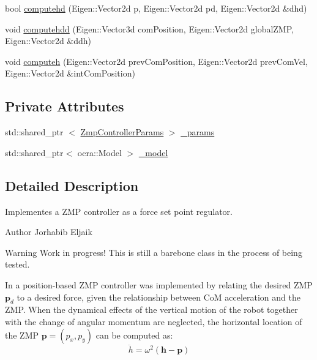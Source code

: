 \begin{DoxyCompactItemize}
\item 
bool \hyperlink{classZmpController_a5eab881a51fb2ace1a1d494171353bc7}{computehd} (\-Eigen\-::\-Vector2d p, \-Eigen\-::\-Vector2d pd, \-Eigen\-::\-Vector2d \&dhd)
\item 
void \hyperlink{classZmpController_aa450c67048a44fe0dfadf07cd30165e7}{computehdd} (\-Eigen\-::\-Vector3d com\-Position, \-Eigen\-::\-Vector2d global\-Z\-M\-P, \-Eigen\-::\-Vector2d \&ddh)
\item 
void \hyperlink{classZmpController_a3e275de73186b889c755e6dc618d29bf}{computeh} (\-Eigen\-::\-Vector2d prev\-Com\-Position, \-Eigen\-::\-Vector2d prev\-Com\-Vel, \-Eigen\-::\-Vector2d \&int\-Com\-Position)
\end{DoxyCompactItemize}
\subsection*{\-Private \-Attributes}
\begin{DoxyCompactItemize}
\item 
std\-::shared\-\_\-ptr\*
$<$ \hyperlink{structZmpControllerParams}{\-Zmp\-Controller\-Params} $>$ \hyperlink{classZmpController_a59a45aafc8a49a0d49966f7ed061a022}{\-\_\-params}
\item 
std\-::shared\-\_\-ptr$<$ ocra\-::\-Model $>$ \hyperlink{classZmpController_ac86a58d1f870ce27c78b0f6d2294e05f}{\-\_\-model}
\end{DoxyCompactItemize}


\subsection{\-Detailed \-Description}
\-Implementes a \-Z\-M\-P controller as a force set point regulator. 

\begin{DoxyAuthor}{\-Author}
\-Jorhabib \-Eljaik
\end{DoxyAuthor}
\cite{krause2012stabilization}

\begin{DoxyWarning}{\-Warning}
\-Work in progress! \-This is still a barebone class in the process of being tested.
\end{DoxyWarning}
\-In \cite{krause2012stabilization} a position-\/based \-Z\-M\-P controller was implemented by relating the desired \-Z\-M\-P $ \mathbf{p}_d $ to a desired force, given the relationship between \-Co\-M acceleration and the \-Z\-M\-P. \-When the dynamical effects of the vertical motion of the robot together with the change of angular momentum are neglected, the horizontal location of the \-Z\-M\-P $\mathbf{p} = (p_x, p_y)$ can be computed as\-: \label{classZmpController_simplifiedZMP}%
\hypertarget{classZmpController_simplifiedZMP}{}%
 \begin{equation} \ddot{h} = \omega^2(\mathbf{h} - \mathbf{p}) \end{equation}

